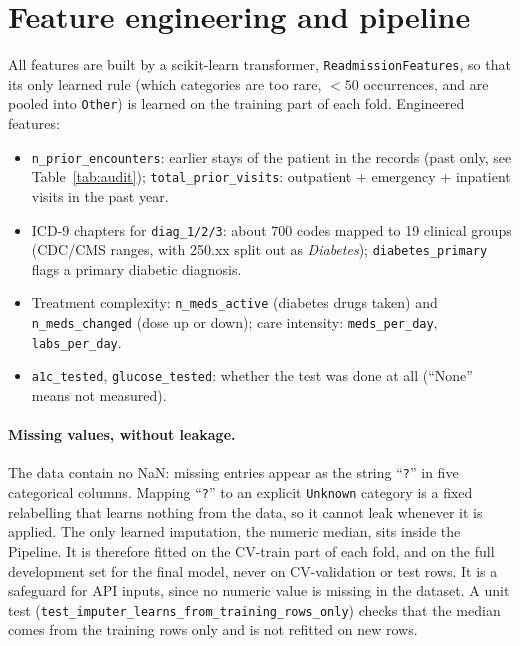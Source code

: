 \documentclass[11pt,a4paper]{article}
\newcommand{\code}[1]{\texttt{\small #1}}
\begin{document}
\section{Feature engineering and pipeline}
\label{sec:features}

All features are built by a scikit-learn transformer, \code{ReadmissionFeatures}, so that its only learned rule (which categories are too rare, $<50$ occurrences, and are pooled into \code{Other}) is learned on the training part of each fold. Engineered features:
\begin{itemize}
\item \code{n\_prior\_encounters}: earlier stays of the patient in the records (past only, see Table~\ref{tab:audit}); \code{total\_prior\_visits}: outpatient + emergency + inpatient visits in the past year.
\item ICD-9 chapters for \code{diag\_1/2/3}: about 700 codes mapped to 19 clinical groups (CDC/CMS ranges, with 250.xx split out as \emph{Diabetes}); \code{diabetes\_primary} flags a primary diabetic diagnosis.
\item Treatment complexity: \code{n\_meds\_active} (diabetes drugs taken) and \code{n\_meds\_changed} (dose up or down); care intensity: \code{meds\_per\_day}, \code{labs\_per\_day}.
\item \code{a1c\_tested}, \code{glucose\_tested}: whether the test was done at all (``None'' means not measured).
\end{itemize}

\paragraph{Missing values, without leakage.} The data contain no NaN: missing entries appear as the string ``\code{?}'' in five categorical columns. Mapping ``\code{?}'' to an explicit \code{Unknown} category is a fixed relabelling that learns nothing from the data, so it cannot leak whenever it is applied. The only learned imputation, the numeric median, sits inside the Pipeline. It is therefore fitted on the CV-train part of each fold, and on the full development set for the final model, never on CV-validation or test rows. It is a safeguard for API inputs, since no numeric value is missing in the dataset. A unit test (\code{test\_imputer\_learns\_from\_training\_rows\_only}) checks that the median comes from the training rows only and is not refitted on new rows.
\end{document}

